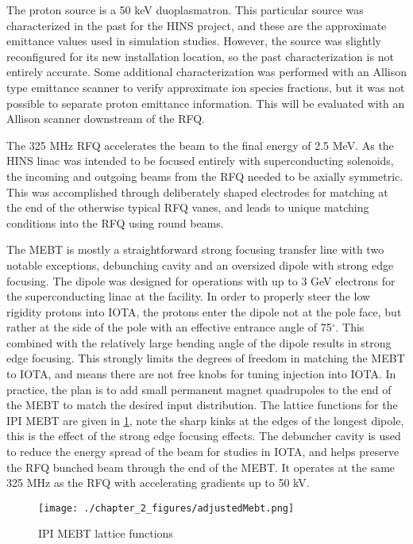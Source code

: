 The proton source is a 50 keV duoplasmatron. This particular source was characterized in the past \cite{tamCharacterizationProtonIon2010} for the HINS project, and these are the approximate emittance values used in simulation studies. However, the source was slightly reconfigured for its new installation location, so the past characterization is not entirely accurate. Some additional characterization was performed with an Allison type emittance scanner to verify approximate ion species fractions, but it was not possible to separate proton emittance information. This will be evaluated with an Allison scanner downstream of the RFQ.

The 325 MHz RFQ accelerates the beam to the final energy of 2.5 MeV. As the HINS linac was intended to be focused entirely with superconducting solenoids, the incoming and outgoing beams from the RFQ needed to be axially symmetric. This was accomplished through deliberately shaped electrodes for matching at the end of the otherwise typical RFQ vanes, and leads to unique matching conditions into the RFQ using round beams. 

The MEBT is mostly a straightforward strong focusing transfer line with two notable exceptions, debunching cavity and an oversized dipole with strong edge focusing. The dipole was designed for operations with up to 3 GeV electrons for the superconducting linac at the facility. In order to properly steer the low rigidity protons into IOTA, the protons enter the dipole not at the pole face, but rather at the side of the pole with an effective entrance angle of 75$^\circ$. This combined with the relatively large bending angle of the dipole results in strong edge focusing. This strongly limits the degrees of freedom in matching the MEBT to IOTA, and means there are not free knobs for tuning injection into IOTA. In practice, the plan is to add small permanent magnet quadrupoles to the end of the MEBT to match the desired input distribution. The lattice functions for the IPI MEBT are given in \ref{fig:mebtLattice}, note the sharp kinks at the edges of the longest dipole, this is the effect of the strong edge focusing effects. The debuncher cavity is used to reduce the energy spread of the beam for studies in IOTA, and helps preserve the RFQ bunched beam through the end of the MEBT. It operates at the same 325 MHz as the RFQ with accelerating gradients up to 50 kV.

\begin{figure}
	\centering
	\texttt{[image: ./chapter\_2\_figures/adjustedMebt.png]}
	\caption{IPI MEBT lattice functions}
	\label{fig:mebtLattice}
\end{figure}

